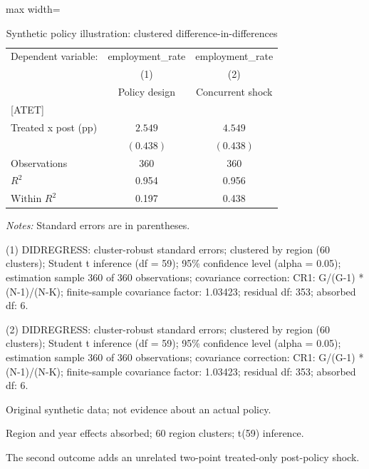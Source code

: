 \begin{table}[htbp]
\centering
\caption{Synthetic policy illustration: clustered difference-in-differences}
\label{tab:lab15-did}
\begingroup
\small
\setlength{\tabcolsep}{6pt}
\renewcommand{\arraystretch}{1.12}
\begin{adjustbox}{max width=\linewidth}
\begin{tabular}{@{}lcc@{}}
\toprule
Dependent variable: & employment\_rate & employment\_rate \\
 & (1) & (2) \\
 & Policy design & Concurrent shock \\
\midrule
{[ATET]} &  &  \\
Treated x post (pp) & $2.549$ & $4.549$ \\
 & $(0.438)$ & $(0.438)$ \\[0.35em]
\midrule
Observations & 360 & 360 \\
$R^{2}$ & 0.954 & 0.956 \\
$\text{Within }R^{2}$ & 0.197 & 0.438 \\
\bottomrule
\end{tabular}
\end{adjustbox}
\par\smallskip
\begin{minipage}{\linewidth}
\footnotesize
\raggedright
\textit{Notes:} Standard errors are in parentheses.\par
(1) DIDREGRESS: cluster-robust standard errors; clustered by region (60 clusters); Student t inference (df = 59); 95\% confidence level (alpha = 0.05); estimation sample 360 of 360 observations; covariance correction: CR1: G/(G-1) * (N-1)/(N-K); finite-sample covariance factor: 1.03423; residual df: 353; absorbed df: 6.\par
(2) DIDREGRESS: cluster-robust standard errors; clustered by region (60 clusters); Student t inference (df = 59); 95\% confidence level (alpha = 0.05); estimation sample 360 of 360 observations; covariance correction: CR1: G/(G-1) * (N-1)/(N-K); finite-sample covariance factor: 1.03423; residual df: 353; absorbed df: 6.\par
Original synthetic data; not evidence about an actual policy.\par
Region and year effects absorbed; 60 region clusters; t(59) inference.\par
The second outcome adds an unrelated two-point treated-only post-policy shock.\par
\end{minipage}
\endgroup
\end{table}

